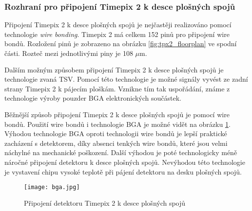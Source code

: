 \subsubsection{Rozhraní pro připojení Timepix 2 k desce plošných spojů}
Připojení Timepix 2 k desce plošných spojů je nejčastěji realizováno pomocí technologie \textit{wire bonding}. Timepix 2 má celkem 152 pinů pro připojení wire bondů. Rozložení pinů je zobrazeno na obrázku \ref{fig:tpx2_floorplan} ve spodní části. Rozteč mezi jednotlivými piny je 108 $\mu$m.

\par Dalším možným způsobem připojení Timepix 2 k desce plošných spojů je technologie zvaná TSV. Pomocí této technologie je možné signály vyvést ze zadní strany Timepix 2 k pájecím ploškám. Vznikne tím tak uspořádání, známe z technologie výroby pouzder BGA elektronických součástek. 
\par Běžnější způsob připojení Timepix 2 k desce plošných spojů je pomocí wire bondů. Použití wire bondů i technologie BGA je možné vidět na obrázku \ref{fig:bga}. Výhodou technologie BGA oproti technologii wire bondů je lepší praktické zacházení s detektorem, díky absenci tenkých wire bondů, které jsou velmi náchylné na mechanické poškození. Další výhodou je poté technologicky méně náročné připojení detektoru k desce plošných spojů. Nevýhodou této technologie je vystavení chipu vysoké teplotě při pájení detektoru na desku plošných spojů.
\begin{figure}[h!]
	\centering
	\captionsetup{justification=centering}
	\texttt{[image: bga.jpg]}
	\caption{Připojení detektoru Timepix 2 k desce plošných spojů \cite{TSV}} 
	\label{fig:bga}
\end{figure}	









